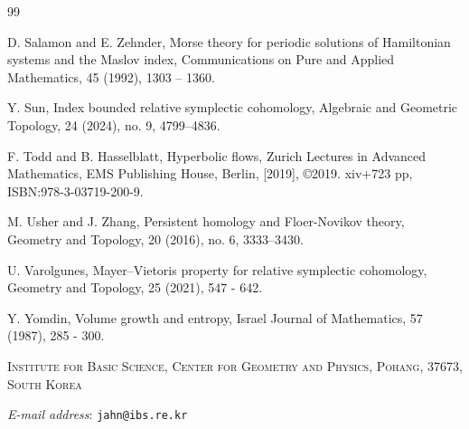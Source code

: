 \documentclass[12pt]{amsart}
\makeatletter
\theoremstyle{definition}
\newcommand{\Addresses}{{
\bigskip
\bigskip
\footnotesize
\textsc{Institute for Basic Science, Center for Geometry and Physics, Pohang, 37673, South Korea}\par\nopagebreak
\textit{E-mail address}: \texttt{jahn@ibs.re.kr}}}
\makeatother
\begin{document}
\begin{thebibliography} {99}

 D. Salamon and E. Zehnder, Morse theory for periodic solutions of Hamiltonian systems and the Maslov index, Communications on Pure and Applied Mathematics, 45 (1992), 1303 – 1360.

 Y. Sun, Index bounded relative symplectic cohomology, Algebraic and Geometric Topology, 24 (2024), no. 9, 4799–4836.

 F. Todd and B. Hasselblatt, Hyperbolic flows, Zurich Lectures in Advanced Mathematics, EMS Publishing House, Berlin, [2019], ©2019. xiv+723 pp, 
ISBN:978-3-03719-200-9.

 M. Usher and J. Zhang, Persistent homology and Floer-Novikov theory, Geometry and Topology, 20 (2016), no. 6, 3333–3430.

 U. Varolgunes, Mayer–Vietoris property for relative symplectic cohomology, Geometry and Topology, 25 (2021), 547 - 642. 


 Y. Yomdin, Volume growth and entropy, Israel Journal of Mathematics, 57 (1987), 285 - 300.




\end{thebibliography}





\Addresses
\end{document}
